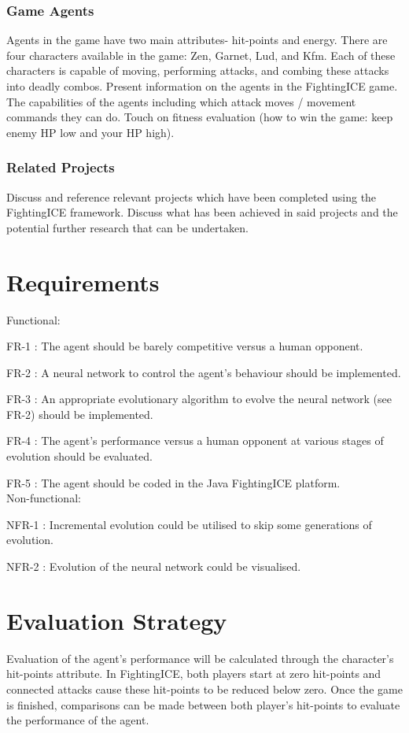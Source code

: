 \documentclass[12pt,a4paper]{article}
\begin{document}
\subsubsection{Game Agents}
Agents in the game have two main attributes- hit-points and energy. There are four characters available in the game: Zen, Garnet, Lud, and Kfm. Each of these characters is capable of moving, performing attacks, and combing these attacks into deadly combos. 
Present information on the agents in the FightingICE game. The capabilities of the agents including which attack moves / movement commands they can do. Touch on fitness evaluation (how to win the game: keep enemy HP low and your HP high).\\


\subsubsection{Related Projects}
Discuss and reference relevant projects which have been completed using the FightingICE framework. Discuss what has been achieved in said projects and the potential further research that can be undertaken.

\newpage
\section{Requirements}
Functional:

FR-1 : The agent should be barely competitive versus a human opponent.

FR-2 : A neural network to control the agent's behaviour should be implemented.

FR-3 : An appropriate evolutionary algorithm to evolve the neural network (see FR-2) should be implemented.

FR-4 : The agent's performance versus a human opponent at various stages of evolution should be evaluated.

FR-5 : The agent should be coded in the Java FightingICE platform.\\

Non-functional:

NFR-1 : Incremental evolution could be utilised to skip some generations of evolution.

NFR-2 : Evolution of the neural network could be visualised.
\newpage
\section{Evaluation Strategy}
Evaluation of the agent's performance will be calculated through the character's hit-points attribute. In FightingICE, both players start at zero hit-points and connected attacks cause these hit-points to be reduced below zero. Once the game is finished, comparisons can be made between both player's hit-points to evaluate the performance of the agent.\\
\end{document}
